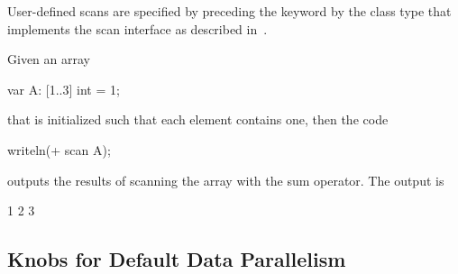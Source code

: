 User-defined scans are specified by preceding the keyword 
by the class type that implements the scan interface as described
in~.

\begin{example}
Given an array
\begin{chapel}
var A: [1..3] int = 1;
\end{chapel}
that is initialized such that each element contains one, then the code
\begin{chapel}
writeln(+ scan A);
\end{chapel}
outputs the results of scanning the array with the sum operator.  The
output is
\begin{chapel}
1 2 3
\end{chapel}
\end{example}

\subsection{Knobs for Default Data Parallelism}
\label{data_parallel_knobs}
